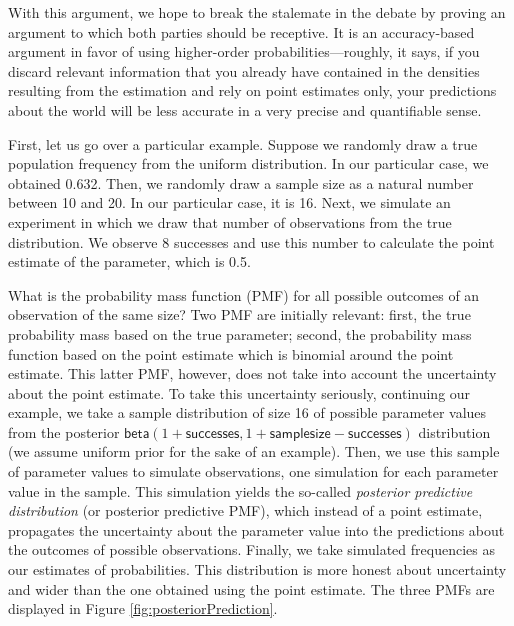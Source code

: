 \documentclass[
  10pt,
  dvipsnames,enabledeprecatedfontcommands]{scrartcl}
\newcommand{\s}[1]{\mbox{$\mathsf{#1}$}}
\begin{document}
With this argument, we hope to break the stalemate in the debate by
proving an argument to which both parties should be receptive. It is an
accuracy-based argument in favor of using higher-order
probabilities---roughly, it says, if you discard relevant information
that you already have contained in the densities resulting from the
estimation and rely on point estimates only, your predictions about the
world will be less accurate in a very precise and quantifiable sense.

First, let us go over a particular example. Suppose we randomly draw a
true population frequency from the uniform distribution. In our
particular case, we obtained 0.632. Then, we randomly draw a sample size
as a natural number between 10 and 20. In our particular case, it is 16.
Next, we simulate an experiment in which we draw that number of
observations from the true distribution. We observe 8 successes and use
this number to calculate the point estimate of the parameter, which is
0.5.

What is the probability mass function (PMF) for all possible outcomes of
an observation of the same size? Two PMF are initially relevant: first,
the true probability mass based on the true parameter; second, the
probability mass function based on the point estimate which is binomial
around the point estimate. This latter PMF, however, does not take into
account the uncertainty about the point estimate. To take this
uncertainty seriously, continuing our example, we take a sample
distribution of size 16 of possible parameter values from the posterior
\(\s{beta}(1+\s{successes}, 1+\s{sample size} - \s{successes})\)
distribution (we assume uniform prior for the sake of an example). Then,
we use this sample of parameter values to simulate observations, one
simulation for each parameter value in the sample. This simulation
yields the so-called \emph{posterior predictive distribution} (or
posterior predictive PMF), which instead of a point estimate, propagates
the uncertainty about the parameter value into the predictions about the
outcomes of possible observations. Finally, we take simulated
frequencies as our estimates of probabilities. This distribution is more
honest about uncertainty and wider than the one obtained using the point
estimate. The three PMFs are displayed in Figure
\ref{fig:posteriorPrediction}.
\end{document}
